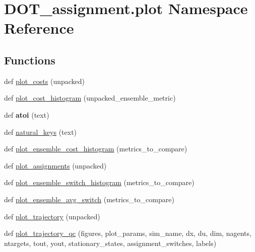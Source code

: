 \hypertarget{namespace_d_o_t__assignment_1_1plot}{}\section{D\+O\+T\+\_\+assignment.\+plot Namespace Reference}
\label{namespace_d_o_t__assignment_1_1plot}
\subsection*{Functions}
\begin{DoxyCompactItemize}
\item 
def \mbox{\hyperlink{namespace_d_o_t__assignment_1_1plot_a34b200ef06cd2da33cd0b0a7f704326a}{plot\+\_\+costs}} (unpacked)
\item 
def \mbox{\hyperlink{namespace_d_o_t__assignment_1_1plot_afb683832b4ea2820d609be73b21eb67f}{plot\+\_\+cost\+\_\+histogram}} (unpacked\+\_\+ensemble\+\_\+metric)
\item 
\mbox{\label{namespace_d_o_t__assignment_1_1plot_a57e89a49b700e60d3c418d4ef279c6ce}} 
def {\bfseries atoi} (text)
\item 
def \mbox{\hyperlink{namespace_d_o_t__assignment_1_1plot_a00241245b524e0e63ba66555364afcf5}{natural\+\_\+keys}} (text)
\item 
def \mbox{\hyperlink{namespace_d_o_t__assignment_1_1plot_ae5f64fdabec72f709496c2da413678be}{plot\+\_\+ensemble\+\_\+cost\+\_\+histogram}} (metrics\+\_\+to\+\_\+compare)
\item 
def \mbox{\hyperlink{namespace_d_o_t__assignment_1_1plot_ad31101e31b7291d4b6504ad2fe1c8a33}{plot\+\_\+assignments}} (unpacked)
\item 
def \mbox{\hyperlink{namespace_d_o_t__assignment_1_1plot_a8e7cceeee3ae69675f6b50f01e7ad5d9}{plot\+\_\+ensemble\+\_\+switch\+\_\+histogram}} (metrics\+\_\+to\+\_\+compare)
\item 
def \mbox{\hyperlink{namespace_d_o_t__assignment_1_1plot_a5037418a2810224c8bbfbe8695770586}{plot\+\_\+ensemble\+\_\+avg\+\_\+switch}} (metrics\+\_\+to\+\_\+compare)
\item 
def \mbox{\hyperlink{namespace_d_o_t__assignment_1_1plot_aa38c6beb5fcecbc098a1aa7038939a9c}{plot\+\_\+trajectory}} (unpacked)
\item 
def \mbox{\hyperlink{namespace_d_o_t__assignment_1_1plot_a241463a4d6d425e3b2045c332ee73877}{plot\+\_\+trajectory\+\_\+qc}} (figures, plot\+\_\+params, sim\+\_\+name, dx, du, dim, nagents, ntargets, tout, yout, stationary\+\_\+states, assignment\+\_\+switches, labels)

\end{DoxyCompactItemize}
